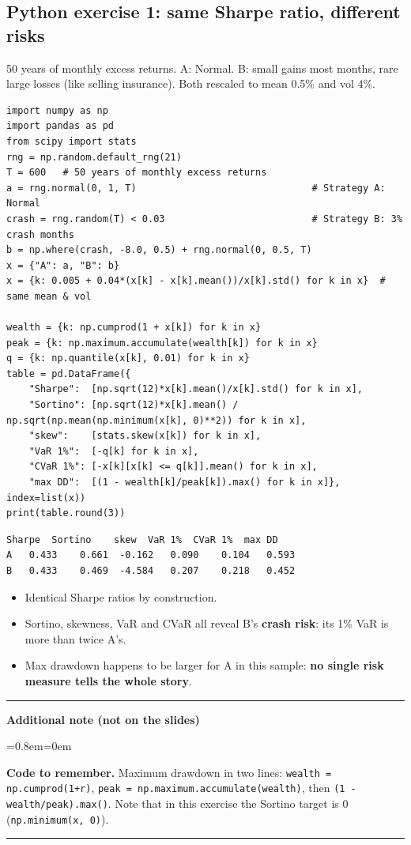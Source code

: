 \documentclass[11pt,a4paper]{report}
\newenvironment{notebox}[1]
  {\par\medskip\Needspace{6\baselineskip}\noindent\rule{\linewidth}{0.4pt}\par\nopagebreak
   \noindent\textbf{#1}\par\nopagebreak
   \begin{list}{}{\leftmargin=0.8em\rightmargin=0em\topsep=2pt}\item[]}
  {\end{list}\nopagebreak\noindent\rule{\linewidth}{0.4pt}\par\medskip}
\newenvironment{addnote}{\begin{notebox}{Additional note (not on the slides)}}{\end{notebox}}
\begin{document}
\subsection*{Python exercise 1: same Sharpe ratio, different risks}
50 years of monthly excess returns. A: Normal. B: small gains most months, rare
large losses (like selling insurance). Both rescaled to mean 0.5\% and vol 4\%.
\begin{lstlisting}
import numpy as np
import pandas as pd
from scipy import stats
rng = np.random.default_rng(21)
T = 600   # 50 years of monthly excess returns
a = rng.normal(0, 1, T)                               # Strategy A: Normal
crash = rng.random(T) < 0.03                          # Strategy B: 3% crash months
b = np.where(crash, -8.0, 0.5) + rng.normal(0, 0.5, T)
x = {"A": a, "B": b}
x = {k: 0.005 + 0.04*(x[k] - x[k].mean())/x[k].std() for k in x}  # same mean & vol

wealth = {k: np.cumprod(1 + x[k]) for k in x}
peak = {k: np.maximum.accumulate(wealth[k]) for k in x}
q = {k: np.quantile(x[k], 0.01) for k in x}
table = pd.DataFrame({
    "Sharpe":  [np.sqrt(12)*x[k].mean()/x[k].std() for k in x],
    "Sortino": [np.sqrt(12)*x[k].mean() / np.sqrt(np.mean(np.minimum(x[k], 0)**2)) for k in x],
    "skew":    [stats.skew(x[k]) for k in x],
    "VaR 1%":  [-q[k] for k in x],
    "CVaR 1%": [-x[k][x[k] <= q[k]].mean() for k in x],
    "max DD":  [(1 - wealth[k]/peak[k]).max() for k in x]}, index=list(x))
print(table.round(3))
\end{lstlisting}
\begin{lstlisting}[style=out]
   Sharpe  Sortino    skew  VaR 1%  CVaR 1%  max DD
A   0.433    0.661  -0.162   0.090    0.104   0.593
B   0.433    0.469  -4.584   0.207    0.218   0.452
\end{lstlisting}
\begin{itemize}
  \item Identical Sharpe ratios by construction.
  \item Sortino, skewness, VaR and CVaR all reveal B's \textbf{crash risk}: its 1\% VaR is more than twice A's.
  \item Max drawdown happens to be larger for A in this sample: \textbf{no single risk measure tells the whole story}.
\end{itemize}

\begin{addnote}
\textbf{Code to remember.} Maximum drawdown in two lines:
\texttt{wealth = np.cumprod(1+r)}, \texttt{peak = np.maximum.accumulate(wealth)},
then \texttt{(1 - wealth/peak).max()}. Note that in this exercise the Sortino
target is 0 (\texttt{np.minimum(x, 0)}).
\end{addnote}
\end{document}
